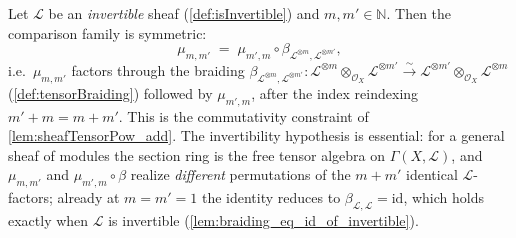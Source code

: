 \begin{lemma}

  \label{lem:tensorPowAdd_comm}
  Let \(\mathcal{L}\) be an \emph{invertible} sheaf (\cref{def:isInvertible}) and
  \(m, m' \in \mathbb{N}\). Then the comparison family is symmetric:
  \[
    \mu_{m,m'} \;=\;
      \mu_{m',m} \circ
      \beta_{\mathcal{L}^{\otimes m}, \mathcal{L}^{\otimes m'}},
  \]
  i.e.\ \(\mu_{m,m'}\) factors through the braiding
  \(\beta_{\mathcal{L}^{\otimes m},\mathcal{L}^{\otimes m'}} :
  \mathcal{L}^{\otimes m} \otimes_{\mathcal{O}_X} \mathcal{L}^{\otimes m'}
  \xrightarrow{\sim}
  \mathcal{L}^{\otimes m'} \otimes_{\mathcal{O}_X} \mathcal{L}^{\otimes m}\)
  (\cref{def:tensorBraiding}) followed by \(\mu_{m',m}\), after the index
  reindexing \(m' + m = m + m'\). This is the commutativity constraint of
  \cref{lem:sheafTensorPow_add}. The invertibility hypothesis is essential: for a
  general sheaf of modules the section ring is the free tensor algebra on
  \(\Gamma(X,\mathcal{L})\), and \(\mu_{m,m'}\) and \(\mu_{m',m} \circ \beta\)
  realize \emph{different} permutations of the \(m + m'\) identical
  \(\mathcal{L}\)-factors; already at \(m = m' = 1\) the identity reduces to
  \(\beta_{\mathcal{L},\mathcal{L}} = \mathrm{id}\), which holds exactly when
  \(\mathcal{L}\) is invertible (\cref{lem:braiding_eq_id_of_invertible}).
\end{lemma}

